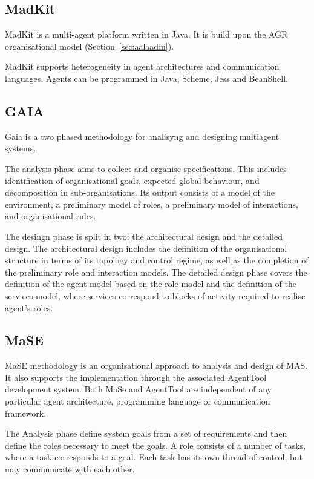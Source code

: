 \documentclass{article}
\begin{document}
\subsection{MadKit} 

MadKit \cite{conf/agents/GutknechtF00a} is a multi-agent platform written in Java. It is build upon the AGR
organisational model (Section~\ref{sec:aalaadin}).

MadKit supports heterogeneity in agent architectures and communication
languages. Agents can be programmed in Java, Scheme, Jess and BeanShell.

\subsection{GAIA}

Gaia \cite{journals/aamas/WooldridgeJK00} is a two phased methodology for analisyng and designing multiagent
systems.

The analysis phase aims to collect and organise specifications. This includes
identification of organisational goals, expected global behaviour, and
decomposition in sub-organisations. Its output consists of a model of the
environment, a preliminary model of roles, a preliminary model of interactions,
and organisational rules.

The desingn phase is split in two: the architectural design and the detailed
design. The architectural design includes the definition of the organisational
structure in terms of its topology and control regime, as well as the
completion of the preliminary role and interaction models. The detailed design
phase covers the definition of the agent model based on the role model and the
definition of the services model, where services correspond to blocks of
activity required to realise agent's roles.

\cite{BlakeG05}
\cite{conf/aose/WooldridgeC00}

\subsection{MaSE}

MaSE methodology \cite{deloach2004mase} is an organisational approach to
analysis and design of MAS. It also supports the implementation through the
associated AgentTool development system. Both MaSe and AgentTool are independent of any particular agent architecture, programming language or communication framework.

The Analysis phase define system goals from a set of requirements and then define the roles necessary to meet the goals. A role consists of a number of tasks, where a task corresponds to a goal. Each task has its own thread of control, but may communicate with each other.
\end{document}
